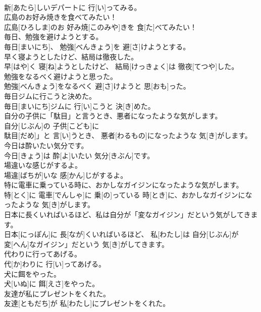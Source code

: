 \documentclass[8pt]{extreport}
\begin{document}
\begin{CJK}{UTF8}{min}
\\	新[あたら]しいデパートに 行[い]ってみる。	
\\	広島のお好み焼きを食べてみたい！	
\\	広島[ひろしま]のお 好み焼[このみや]きを 食[た]べてみたい！	
\\	毎日、勉強を避けようとする。	
\\	毎日[まいにち]、 勉強[べんきょう]を 避[さ]けようとする。	
\\	早く寝ようとしたけど、結局は徹夜した。	
\\	早[はや]く 寝[ね]ようとしたけど、 結局[けっきょく]は 徹夜[てつや]した。	
\\	勉強をなるべく避けようと思った。	
\\	勉強[べんきょう]をなるべく 避[さ]けようと 思[おも]った。	
\\	毎日ジムに行こうと決めた。	
\\	毎日[まいにち]ジムに 行[い]こうと 決[き]めた。	
\\	自分の子供に「駄目」と言うとき、悪者になったような気がします。	
\\	自分[じぶん]の 子供[こども]に
\\	駄目[だめ]」と 言[い]うとき、 悪者[わるもの]になったような 気[き]がします。	
\\	今日は酔いたい気分です。	
\\	今日[きょう]は 酔[よ]いたい 気分[きぶん]です。	
\\	場違いな感じがするよ。	
\\	場違[ばちが]いな 感[かん]じがするよ。	
\\	特に電車に乗っている時に、おかしなガイジンになったような気がします。	
\\	特[とく]に 電車[でんしゃ]に 乗[の]っている 時[とき]に、おかしなガイジンになったような 気[き]がします。	
\\	日本に長くいればいるほど、私は自分が「変なガイジン」だという気がしてきます。	
\\	日本[にっぽん]に 長[なが]くいればいるほど、 私[わたし]は 自分[じぶん]が
\\	変[へん]なガイジン」だという 気[き]がしてきます。	
\\	代わりに行ってあげる。	
\\	代[か]わりに 行[い]ってあげる。	
\\	犬に餌をやった。	
\\	犬[いぬ]に 餌[えさ]をやった。	
\\	友達が私にプレゼントをくれた。	
\\	友達[ともだち]が 私[わたし]にプレゼントをくれた。	

\end{CJK}
\end{document}
